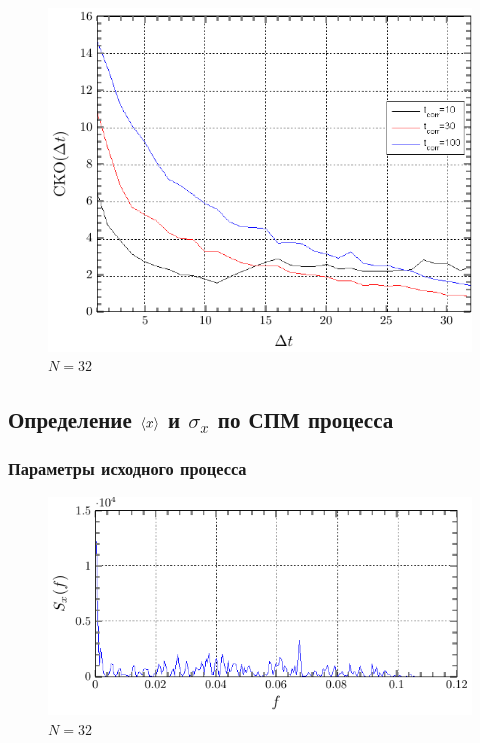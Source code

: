 \documentclass[a4paper,14pt]{extarticle}
\begin{document}
\begin{figure}[H]
    \centering
    \includegraphics[width=0.7\linewidth]{fig/sko_n32.pdf}
    \vspace{-0.7em}
    \caption{$N=32$}
    \label{fig:sko_n32}
\end{figure}




\subsection{Определение $\langle x\rangle$ и $\sigma_x$ по  СПМ процесса}

\subsubsection{Параметры исходного процесса}

\begin{figure}[H]
    \centering
    \includegraphics[width=0.7\linewidth]{fig/S_from_f_100_ex51}
    \vspace{-0.7em}
    \caption{$N=32$}
    \label{fig:sko_ex51}
\end{figure}
\end{document}
